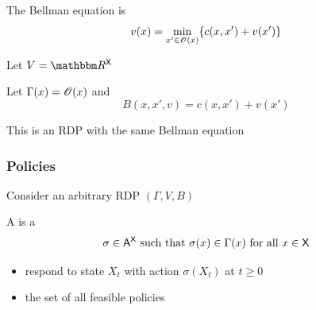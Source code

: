 \documentclass[dvipsnames]{beamer}
\begin{document}
\begin{frame}

    The Bellman equation is
    \begin{equation*}
        v(x) = \min_{x' \in \mathscr O(x)} \{ c(x, x') + v(x') \}
    \end{equation*}

    \vspace{0.5em}
    Let $V = \RR^\Xsf$

    \vspace{0.5em}
    \vspace{0.5em}
    Let $\Gamma(x) = \mathscr O(x)$ and
    \begin{equation*}
        B(x, x', v) = c(x, x') + v(x')  
    \end{equation*}

    This is an RDP with the same Bellman equation

\end{frame}



\begin{frame}
    \frametitle{Policies}
    

    \vspace{0.5em}
    Consider an arbitrary RDP $(\Gamma, V, B)$
    \vspace{0.5em}

    A  is a
    \begin{equation*}
            \sigma \in \mathsf A^\mathsf X
            \text{ such that }
            \sigma(x) \in \Gamma(x) \text{ for all } x \in \mathsf X
    \end{equation*}

    \vspace{0.5em}
    \vspace{0.5em}

    \begin{itemize}
        \item respond to state $X_t$ with action $\sigma(X_t)$ at 
         $t \geq 0$
        \vspace{0.5em}
        \vspace{0.5em}
        \item \navy{$\Sigma := $} the set of all feasible policies
    \end{itemize}



\end{frame}
\end{document}
